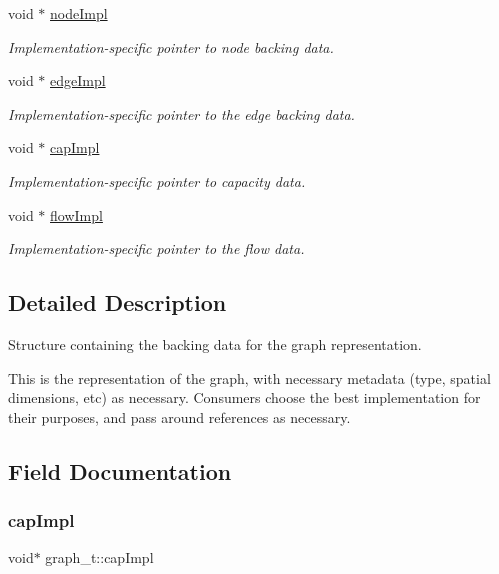 \begin{DoxyCompactItemize}
void $\ast$ \hyperlink{structgraph__t_a3bf6344f03f4cbc69345d026da2e3368}{node\+Impl}
\begin{DoxyCompactList}\small\item\em Implementation-\/specific pointer to node backing data. \end{DoxyCompactList}\item 
void $\ast$ \hyperlink{structgraph__t_acadea26a56e788cb109413045138faba}{edge\+Impl}
\begin{DoxyCompactList}\small\item\em Implementation-\/specific pointer to the edge backing data. \end{DoxyCompactList}\item 
void $\ast$ \hyperlink{structgraph__t_ab85359c7dfbc46f84976a85c4104b1f5}{cap\+Impl}
\begin{DoxyCompactList}\small\item\em Implementation-\/specific pointer to capacity data. \end{DoxyCompactList}\item 
void $\ast$ \hyperlink{structgraph__t_aff85993441e72a7815da3fa1b048e5eb}{flow\+Impl}
\begin{DoxyCompactList}\small\item\em Implementation-\/specific pointer to the flow data. \end{DoxyCompactList}\end{DoxyCompactItemize}


\subsection{Detailed Description}
Structure containing the backing data for the graph representation. 

This is the representation of the graph, with necessary metadata (type, spatial dimensions, etc) as necessary. Consumers choose the best implementation for their purposes, and pass around references as necessary. 

\subsection{Field Documentation}
\mbox{\label{structgraph__t_ab85359c7dfbc46f84976a85c4104b1f5}} 
\subsubsection{\texorpdfstring{cap\+Impl}{capImpl}}
{\footnotesize\ttfamily void$\ast$ graph\+\_\+t\+::cap\+Impl}



